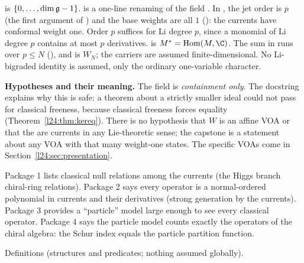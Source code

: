 \begin{dictionary}
 is $\{0,\dots,\dim\mathfrak g-1\}$.  is a
one-line renaming of the field . In , the jet order is $p$ (the first
argument of ) and the base weights are all $1$ ():
the currents have conformal weight one. Order $p$ suffices for Li degree $p$, since a monomial of Li degree $p$
contains at most $p$ derivatives.  is $M^*=\operatorname{Hom}(M,\C)$. The sum in
 runs over $p\le N$ (), and  is
$W_N$; the carriers are assumed finite-dimensional. No Li-bigraded identity is assumed, only the
ordinary one-variable character.

\textbf{Hypotheses and their meaning.} The  field is \emph{containment only}. The docstring
explains why this is safe: a theorem about a strictly smaller ideal could not pass for classical
freeness, because classical freeness forces equality (Theorem~\ref{l24:thm:kereq}). There is no
hypothesis that $W$ is an affine VOA or that the  are currents in any Lie-theoretic sense; the
capstone is a statement about any VOA with that many weight-one states. The specific VOAs come in
Section~\ref{l24:sec:presentation}.
\end{dictionary}

\begin{physics}
Package 1 lists classical null relations among the currents (the Higgs branch chiral-ring relations).
Package 2 says every operator is a normal-ordered polynomial in currents and their derivatives (strong
generation by the currents). Package 3 provides a ``particle'' model large enough to see every classical
operator. Package 4 says the particle model counts exactly the operators of the chiral algebra: the Schur
index equals the particle partition function.
\end{physics}

\begin{status}
Definitions (structures and predicates; nothing assumed globally).
\end{status}

